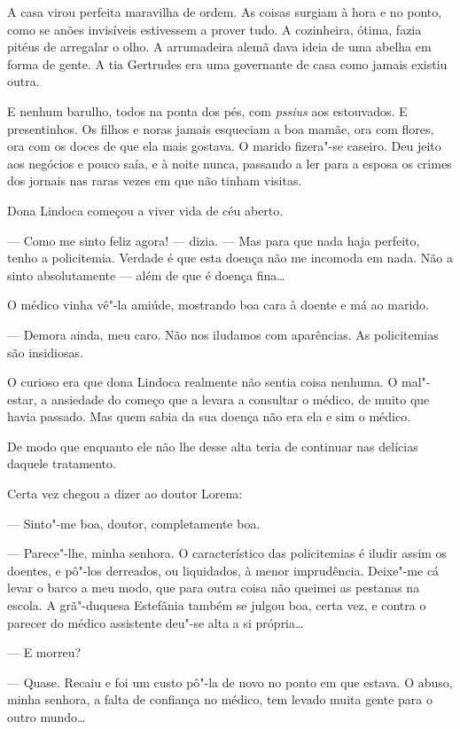 A casa virou perfeita maravilha de ordem. As coisas surgiam à hora e no
ponto, como se anões invisíveis estivessem a prover tudo. A cozinheira,
ótima, fazia pitéus de arregalar o olho. A arrumadeira alemã dava ideia
de uma abelha em forma de gente. A tia Gertrudes era uma governante de
casa como jamais existiu outra.

E nenhum barulho, todos na ponta dos pés, com \emph{pssius} aos
estouvados. E presentinhos. Os filhos e noras jamais esqueciam a boa
mamãe, ora com flores, ora com os doces de que ela mais gostava. O
marido fizera"-se caseiro. Deu jeito aos negócios e pouco saía, e à noite
nunca, passando a ler para a esposa os crimes dos jornais nas raras
vezes em que não tinham visitas.

Dona Lindoca começou a viver vida de céu aberto.

--- Como me sinto feliz agora! --- dizia. --- Mas para que nada haja
perfeito, tenho a policitemia. Verdade é que esta doença não me incomoda
em nada. Não a sinto absolutamente --- além de que é doença fina\ldots{}

O médico vinha vê"-la amiúde, mostrando boa cara à doente e má ao marido.

--- Demora ainda, meu caro. Não nos iludamos com aparências. As
policitemias são insidiosas.

O curioso era que dona Lindoca realmente não sentia coisa nenhuma. O
mal"-estar, a ansiedade do começo que a levara a consultar o médico, de
muito que havia passado. Mas quem sabia da sua doença não era ela e sim
o médico.

De modo que enquanto ele não lhe desse alta teria de continuar nas
delícias daquele tratamento.

Certa vez chegou a dizer ao doutor Lorena:

--- Sinto"-me boa, doutor, completamente boa.

--- Parece"-lhe, minha senhora. O característico das policitemias é
iludir assim os doentes, e pô"-los derreados, ou liquidados, à menor
imprudência. Deixe"-me cá levar o barco a meu modo, que para outra coisa
não queimei as pestanas na escola. A grã"-duquesa Estefânia também se
julgou boa, certa vez, e contra o parecer do médico assistente deu"-se
alta a si própria\ldots{}

--- E morreu?

--- Quase. Recaiu e foi um custo pô"-la de novo no ponto em que estava. O
abuso, minha senhora, a falta de confiança no médico, tem levado muita
gente para o outro mundo\ldots{}

